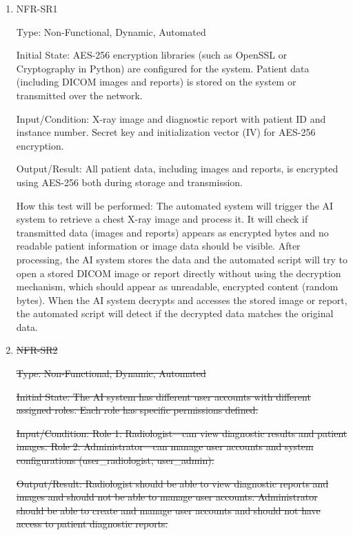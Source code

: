 \documentclass[12pt, titlepage]{article}
\begin{document}
\begin{enumerate}
\begin{enumerate}
\begin{enumerate}
\begin{enumerate}

\item{NFR-SR1\\}\label{NFR-SR1}

Type: Non-Functional, Dynamic, Automated

Initial State: AES-256 encryption libraries (such as OpenSSL or Cryptography in Python) are configured for the system. Patient data (including DICOM images and reports) is stored on the system or transmitted over the network.

Input/Condition: X-ray image and diagnostic report with patient ID and instance number. Secret key and initialization vector (IV) for AES-256 encryption.

Output/Result: All patient data, including images and reports, is encrypted using AES-256 both during storage and transmission.

How this test will be performed: The automated system will trigger the AI system to retrieve a chest X-ray image and process it. It will check if transmitted data (images and reports) appears as encrypted bytes and no readable patient information or image data should be visible. After processing, the AI system stores the data and the automated script will try to open a stored DICOM image or report directly without using the decryption mechanism, which should appear as unreadable, encrypted content (random bytes). When the AI system decrypts and accesses the stored image or report, the automated script will detect if the decrypted data matches the original data.

\item{\sout{NFR-SR2}\\}\label{NFR-SR2}

\sout{Type: Non-Functional, Dynamic, Automated}

\sout{Initial State: The AI system has different user accounts with different assigned roles. Each role has specific permissions defined.}

\sout{Input/Condition: Role 1: Radiologist—can view diagnostic results and patient images. Role 2: Administrator—can manage user accounts and system configurations (user\_radiologist, user\_admin).}

\sout{Output/Result: Radiologist should be able to view diagnostic reports and images and should not be able to manage user accounts. Administrator should be able to create and manage user accounts and should not have access to patient diagnostic reports.}


\end{enumerate}
\end{enumerate}
\end{enumerate}
\end{enumerate}
\end{document}

